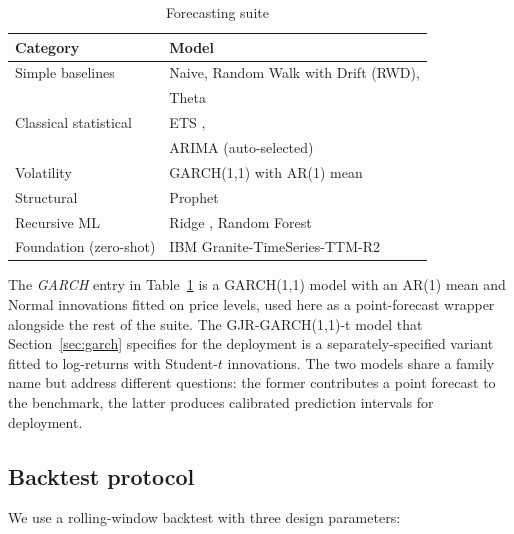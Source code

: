 \documentclass[conference]{IEEEtran}
\begin{document}
\begin{table}[t]
\caption{Forecasting suite}
\label{tab:suite}
\centering
\renewcommand{\arraystretch}{1.1}
\begin{tabular}{@{}ll@{}}
\toprule
\textbf{Category} & \textbf{Model} \\
\midrule
Simple baselines & Naive, Random Walk with Drift (RWD), \\
                 & Theta \cite{assimakopoulos2000theta} \\
Classical statistical & ETS \cite{hyndman2008forecasting}, \\
                      & ARIMA (auto-selected) \cite{box2015time,hyndman2008automatic} \\
Volatility           & GARCH(1{,}1) with AR(1) mean \cite{bollerslev1986generalized} \\
Structural           & Prophet \cite{taylor2018forecasting} \\
Recursive ML         & Ridge \cite{hoerl1970ridge}, Random Forest \cite{breiman2001random} \\
Foundation (zero-shot) & IBM Granite-TimeSeries-TTM-R2 \cite{ekambaram2024ttm} \\
\bottomrule
\end{tabular}
\end{table}

The \emph{GARCH} entry in Table~\ref{tab:suite} is a GARCH(1{,}1)
model with an AR(1) mean and Normal innovations fitted on price
levels, used here as a point-forecast wrapper alongside the rest of
the suite. The GJR-GARCH(1{,}1)-t model that Section~\ref{sec:garch}
specifies for the deployment is a separately-specified variant fitted
to log-returns with Student-$t$ innovations. The two models share a
family name but address different questions: the former contributes a
point forecast to the benchmark, the latter produces calibrated
prediction intervals for deployment.

\subsection{Backtest protocol}

We use a rolling-window backtest with three design parameters:
\end{document}
